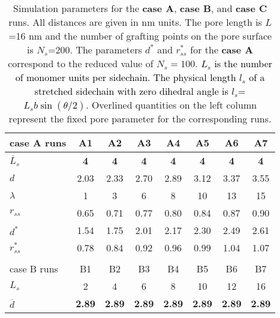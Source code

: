 \documentclass[3p,english,preprint]{elsarticle}
\newcommand{\need}[1]{\textcolor{black}{#1}}
\newcommand{\mage}[1]{\textcolor{black}{#1}}
\begin{document}
\begin{table}[!ht]
\begin{center}
\caption{\label{table-abc} Simulation parameters for the 
{\bf case A}, {\bf case B}, and {\bf case C} runs. 
All distances are given in nm units.
 The pore length is $L$=16 nm and the number of grafting points on 
the pore surface is $N_s$=200. 
The parameters $d^*$ and $r_{ss}^*$ for the {\bf case A}
 correspond to the reduced value of $N_s=100$. 
{\need{ 
$L_s$ is the number of monomer units per sidechain. The physical length 
$l_s$ of a stretched  sidechain with zero dihedral angle is $l_s$=$L_s b \sin(\theta/2)$.
}}
Overlined quantities on the left column represent the fixed pore parameter for the corresponding runs. 
}
\begin{tabular}[t]{lccccccc}
\hline %
\hline %
case A runs            & A1  & A2   &  A3 &  A4 & A5 &   A6 & A7  \\ 
\hline %
{\bf $ \overline L_s $}  & {\bf 4 }  & {\bf 4}    & {\bf 4}   & {\bf 4}   &{\bf 4}    & {\bf 4}   & {\bf 4}  \\
$d$  %
 & 2.03 & 2.33 & 2.70     &2.89   & 3.12 & 3.37 & 3.55  \\
 $ \lambda $  & 1   & 3    & 6   & 8   & 10    & 13   & 15  \\
$r_{ss}$  & 0.65 & 0.71 & 0.77  & 0.80   & 0.84  & 0.87 & 0.90   \\
$d^*$  %
   & 1.54 & 1.75 & 2.01 & 2.17   & 2.30 & 2.49 & 2.61  \\
$r_{ss}^*$ %
    & 0.78 & 0.84  & 0.92  & 0.96   & 0.99  & 1.04 & 1.07   \\
$ $  &     &       &       &        &       &      &  \\
\hline %
case B runs             & B1  & B2   &  B3 & B4 & B5 & B6 & B7  \\   
\hline %
 $L_s$       & 2   & 4 & 6   & 8    & 10  & 12  & 16  \\
{\bf $ \overline d$}  & {\bf 2.89} & {\bf 2.89} & {\bf 2.89}     &{\bf 2.89}   & {\bf 2.89} & {\bf 2.89} & {\bf 2.89}  \\

\end{tabular}
\end{center}
\end{table}
\end{document}

